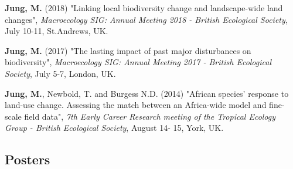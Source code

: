 \documentclass[12pt,a4paper,serif]{moderncv}        %
\begin{document}
\begin{bibenum}

    \item \textbf{Jung, M.} (2018) "Linking local biodiversity change and landscape-wide land changes", \emph{Macroecology SIG: Annual Meeting 2018 - British Ecological Society}, July 10-11, St.Andrews, UK.

    \item \textbf{Jung, M.} (2017) "The lasting impact of past major disturbances on biodiversity", \emph{Macroecology SIG: Annual Meeting 2017 - British Ecological Society}, July 5-7, London, UK.

    \item \textbf{Jung, M.}, Newbold, T. and Burgess N.D. (2014) "African species' response to land-use change. Assessing the match between an Africa-wide model and fine-scale field data", \emph{7th Early Career Research meeting of the Tropical Ecology Group - British Ecological Society}, August 14- 15, York, UK.

\end{bibenum}

\vspace{6pt}
\subsection{Posters}
\end{document}
